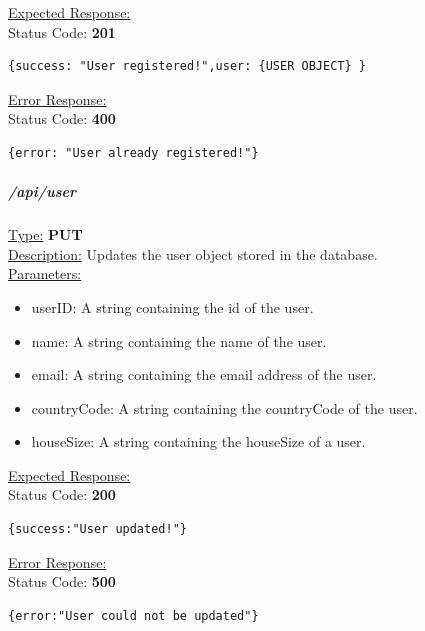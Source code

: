\documentclass[draft,preprint,12pt,3p]{elsarticle}
\newcommand{\forceindent}{\leavevmode{\parindent=1em\indent}}
\begin{document}
\underline{Expected Response:}\\[5pt]
\forceindent Status Code: \textbf{201} \\
\begin{verbatim}
{success: "User registered!",user: {USER OBJECT} }
\end{verbatim}
\underline{Error Response:}\\[5pt]
\forceindent Status Code: \textbf{400} \\
\begin{verbatim}
{error: "User already registered!"}
\end{verbatim}


\subparagraph*{/api/user}
\underline{Type:} \textbf{PUT}\\

\underline{Description:} Updates the user object stored in the database.\\

\underline{Parameters:}
\begin{itemize}
\item userID: A string containing the id of the user.

\item name: A string containing the name of the user.

\item email: A string containing the email address of the user.

\item countryCode: A string containing the countryCode of the user.

\item houseSize: A string containing the houseSize of a user.
\end{itemize}
\underline{Expected Response:}\\[5pt]
\forceindent Status Code: \textbf{200} \\
\begin{verbatim}
{success:"User updated!"}
\end{verbatim}
\underline{Error Response:}\\[5pt]
\forceindent Status Code: \textbf{500} \\
\begin{verbatim}
{error:"User could not be updated"}
\end{verbatim}
\end{document}
